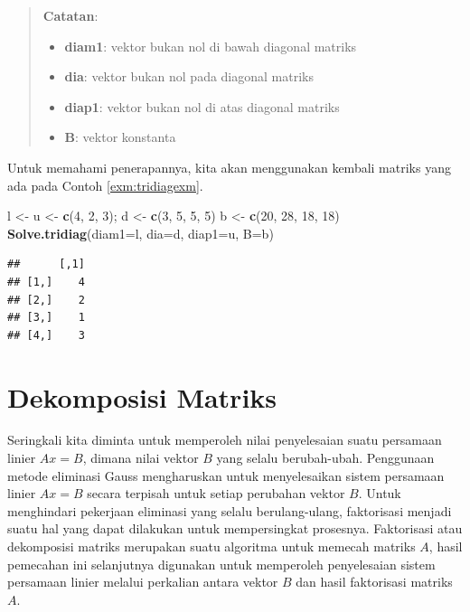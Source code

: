 \documentclass[]{book}
\newenvironment{Shaded}{\begin{snugshade}}{\end{snugshade}}
\newcommand{\DataTypeTok}[1]{\textcolor[rgb]{0.13,0.29,0.53}{#1}}
\newcommand{\DecValTok}[1]{\textcolor[rgb]{0.00,0.00,0.81}{#1}}
\newcommand{\KeywordTok}[1]{\textcolor[rgb]{0.13,0.29,0.53}{\textbf{#1}}}
\newcommand{\NormalTok}[1]{#1}
\newcommand{\StringTok}[1]{\textcolor[rgb]{0.31,0.60,0.02}{#1}}
\providecommand{\tightlist}{%
  \setlength{\itemsep}{0pt}\setlength{\parskip}{0pt}}
\theoremstyle{definition}
\theoremstyle{definition}
\theoremstyle{definition}
\theoremstyle{remark}
\begin{document}
\begin{quote}
\textbf{Catatan}:

\begin{itemize}
\tightlist
\item
  \textbf{diam1}: vektor bukan nol di bawah diagonal matriks
\item
  \textbf{dia}: vektor bukan nol pada diagonal matriks
\item
  \textbf{diap1}: vektor bukan nol di atas diagonal matriks
\item
  \textbf{B}: vektor konstanta
\end{itemize}
\end{quote}

Untuk memahami penerapannya, kita akan menggunakan kembali matriks yang ada pada Contoh \ref{exm:tridiagexm}.

\begin{Shaded}
\begin{Highlighting}[]
\NormalTok{l <-}\StringTok{ }\NormalTok{u <-}\StringTok{ }\KeywordTok{c}\NormalTok{(}\DecValTok{4}\NormalTok{, }\DecValTok{2}\NormalTok{, }\DecValTok{3}\NormalTok{); d <-}\StringTok{ }\KeywordTok{c}\NormalTok{(}\DecValTok{3}\NormalTok{, }\DecValTok{5}\NormalTok{, }\DecValTok{5}\NormalTok{, }\DecValTok{5}\NormalTok{)}
\NormalTok{b <-}\StringTok{ }\KeywordTok{c}\NormalTok{(}\DecValTok{20}\NormalTok{, }\DecValTok{28}\NormalTok{, }\DecValTok{18}\NormalTok{, }\DecValTok{18}\NormalTok{)}
\KeywordTok{Solve.tridiag}\NormalTok{(}\DataTypeTok{diam1=}\NormalTok{l, }\DataTypeTok{dia=}\NormalTok{d, }\DataTypeTok{diap1=}\NormalTok{u, }\DataTypeTok{B=}\NormalTok{b)}
\end{Highlighting}
\end{Shaded}

\begin{verbatim}
##      [,1]
## [1,]    4
## [2,]    2
## [3,]    1
## [4,]    3
\end{verbatim}

\hypertarget{dekomposisimatriks}{%
\section{Dekomposisi Matriks}\label{dekomposisimatriks}}

Seringkali kita diminta untuk memperoleh nilai penyelesaian suatu persamaan linier \(Ax=B\), dimana nilai vektor \(B\) yang selalu berubah-ubah. Penggunaan metode eliminasi Gauss mengharuskan untuk menyelesaikan sistem persamaan linier \(Ax=B\) secara terpisah untuk setiap perubahan vektor \(B\). Untuk menghindari pekerjaan eliminasi yang selalu berulang-ulang, faktorisasi menjadi suatu hal yang dapat dilakukan untuk mempersingkat prosesnya. Faktorisasi atau dekomposisi matriks merupakan suatu algoritma untuk memecah matriks \(A\), hasil pemecahan ini selanjutnya digunakan untuk memperoleh penyelesaian sistem persamaan linier melalui perkalian antara vektor \(B\) dan hasil faktorisasi matriks \(A\).
\end{document}
